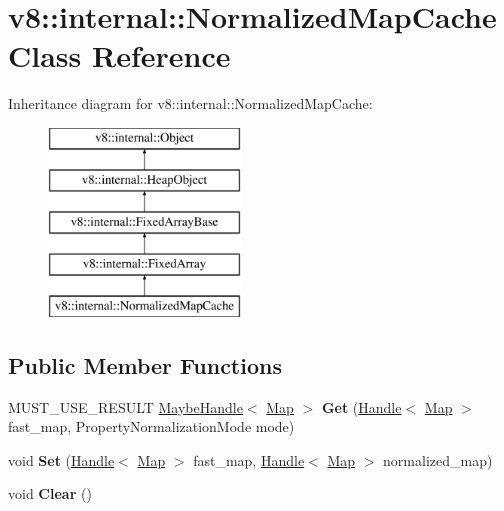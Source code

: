 \hypertarget{classv8_1_1internal_1_1_normalized_map_cache}{}\section{v8\+:\+:internal\+:\+:Normalized\+Map\+Cache Class Reference}
\label{classv8_1_1internal_1_1_normalized_map_cache}
Inheritance diagram for v8\+:\+:internal\+:\+:Normalized\+Map\+Cache\+:\begin{figure}[H]
\begin{center}
\leavevmode
\includegraphics[height=5.000000cm]{classv8_1_1internal_1_1_normalized_map_cache}
\end{center}
\end{figure}
\subsection*{Public Member Functions}
\begin{DoxyCompactItemize}
\item 
\hypertarget{classv8_1_1internal_1_1_normalized_map_cache_a503caab7bc065d42afa3b68c73699ccf}{}M\+U\+S\+T\+\_\+\+U\+S\+E\+\_\+\+R\+E\+S\+U\+L\+T \hyperlink{classv8_1_1internal_1_1_maybe_handle}{Maybe\+Handle}$<$ \hyperlink{classv8_1_1internal_1_1_map}{Map} $>$ {\bfseries Get} (\hyperlink{classv8_1_1internal_1_1_handle}{Handle}$<$ \hyperlink{classv8_1_1internal_1_1_map}{Map} $>$ fast\+\_\+map, Property\+Normalization\+Mode mode)\label{classv8_1_1internal_1_1_normalized_map_cache_a503caab7bc065d42afa3b68c73699ccf}

\item 
\hypertarget{classv8_1_1internal_1_1_normalized_map_cache_ae23fb7f8d42ba9350ade6f64bed55054}{}void {\bfseries Set} (\hyperlink{classv8_1_1internal_1_1_handle}{Handle}$<$ \hyperlink{classv8_1_1internal_1_1_map}{Map} $>$ fast\+\_\+map, \hyperlink{classv8_1_1internal_1_1_handle}{Handle}$<$ \hyperlink{classv8_1_1internal_1_1_map}{Map} $>$ normalized\+\_\+map)\label{classv8_1_1internal_1_1_normalized_map_cache_ae23fb7f8d42ba9350ade6f64bed55054}

\item 
\hypertarget{classv8_1_1internal_1_1_normalized_map_cache_a79ea7891816a709ad98ffbea0764b4e2}{}void {\bfseries Clear} ()\label{classv8_1_1internal_1_1_normalized_map_cache_a79ea7891816a709ad98ffbea0764b4e2}

\end{DoxyCompactItemize}
